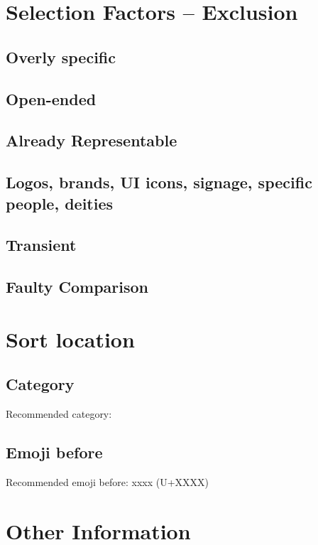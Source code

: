 \documentclass{scrartcl}[10pt,a4paper]
\begin{document}
    \section{Selection Factors -- Exclusion}
        \subsection{Overly specific}
        \subsection{Open-ended}
        \subsection{Already Representable}
        \subsection{Logos, brands, UI icons, signage, specific people, deities}     
        \subsection{Transient}
        \subsection{Faulty Comparison}
    \section{Sort location}
        \subsection{Category}
        Recommended category:
        \subsection{Emoji before}
        Recommended emoji before: xxxx (U+XXXX)
    \section{Other Information}
    
    \printbibliography

\end{document}
